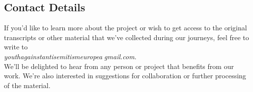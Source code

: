 \subsection*{Contact Details}
If you'd like to learn more about the project or wish to get access to the original transcripts or other material that we've collected during our journeys, feel free to write to \\ \textit{youthagainstantisemitismeurope\textcircled{a}gmail.com}. \\
We'll be delighted to hear from any person or project that benefits from our work. We're also interested in suggestions for collaboration or further processing of the material.
